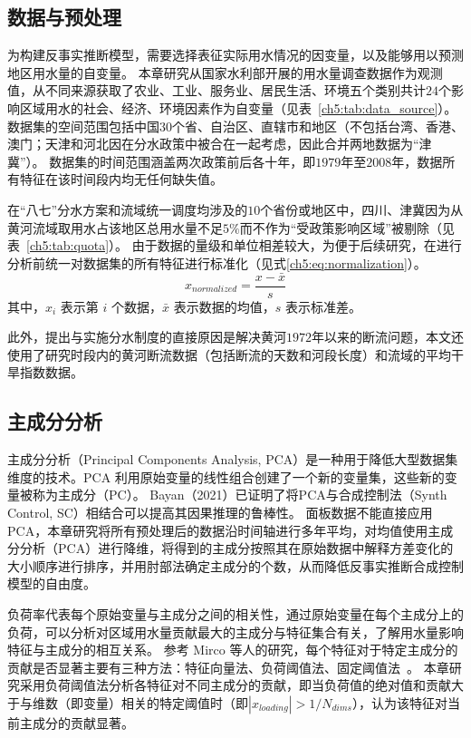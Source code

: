 \subsection{数据与预处理}\label{sec:dataset}

为构建反事实推断模型，需要选择表征实际用水情况的因变量，以及能够用以预测地区用水量的自变量。
本章研究从国家水利部开展的用水量调查数据作为观测值，从不同来源获取了农业、工业、服务业、居民生活、环境五个类别共计$24$个影响区域用水的社会、经济、环境因素作为自变量\cite{zhou2020}（见表~\ref{ch5:tab:data_source}）。
数据集的空间范围包括中国$30$个省、自治区、直辖市和地区（不包括台湾、香港、澳门；天津和河北因在分水政策中被合在一起考虑，因此合并两地数据为“津冀”）。
数据集的时间范围涵盖两次政策前后各十年，即$1979$年至$2008$年，数据所有特征在该时间段内均无任何缺失值。



在“八七”分水方案和流域统一调度均涉及的$10$个省份或地区中，四川、津冀因为从黄河流域取用水占该地区总用水量不足$5\%$而不作为“受政策影响区域”被剔除（见表~\ref{ch5:tab:quota}）。
由于数据的量级和单位相差较大，为便于后续研究，在进行分析前统一对数据集的所有特征进行标准化（见式\ref{ch5:eq:normalization}）。
\begin{equation}
    x_{\textit{normalized}}=\frac{x-\bar{x}}{s}
    \label{ch5:eq:normalization}
\end{equation}
其中，$x_i$ 表示第 $i$ 个数据，$\bar{x}$ 表示数据的均值，$s$ 表示标准差。

此外，提出与实施分水制度的直接原因是解决黄河$1972$年以来的断流问题\cite{wang2019b}，本文还使用了研究时段内的黄河断流数据（包括断流的天数和河段长度）和流域的平均干旱指数数据\cite{wang2022e}。

\subsection{主成分分析}

主成分分析（Principal Components Analysis, PCA）是一种用于降低大型数据集维度的技术。PCA 利用原始变量的线性组合创建了一个新的变量集，这些新的变量被称为主成分（PC）。
Bayan（2021）\cite{bayani2021}已证明了将PCA与合成控制法（Synth Control, SC）相结合可以提高其因果推理的鲁棒性。
面板数据不能直接应用 PCA，本章研究将所有预处理后的数据沿时间轴进行多年平均，对均值使用主成分分析（PCA）进行降维，将得到的主成分按照其在原始数据中解释方差变化的大小顺序进行排序，并用肘部法确定主成分的个数，从而降低反事实推断合成控制模型的自由度。

负荷率代表每个原始变量与主成分之间的相关性，通过原始变量在每个主成分上的负荷，可以分析对区域用水量贡献最大的主成分与特征集合有关，了解用水量影响特征与主成分的相互关系。
参考 Mirco 等人的研究，每个特征对于特定主成分的贡献是否显著主要有三种方法：特征向量法、负荷阈值法、固定阈值法~\cite{migliavacca2021}。
本章研究采用负荷阈值法分析各特征对不同主成分的贡献，即当负荷值的绝对值和贡献大于与维数（即变量）相关的特定阈值时（即$|{x_{loading}}| > 1/N_{dims}$），认为该特征对当前主成分的贡献显著。


